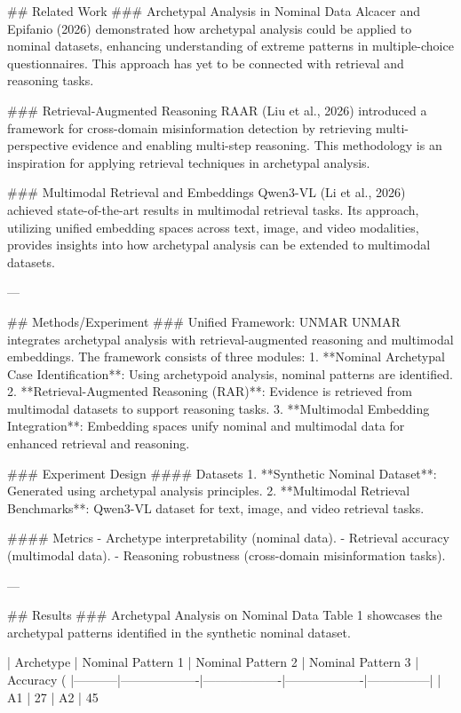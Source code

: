 ## Related Work
### Archetypal Analysis in Nominal Data
Alcacer and Epifanio (2026) demonstrated how archetypal analysis could be applied to nominal datasets, enhancing understanding of extreme patterns in multiple-choice questionnaires. This approach has yet to be connected with retrieval and reasoning tasks.

### Retrieval-Augmented Reasoning
RAAR (Liu et al., 2026) introduced a framework for cross-domain misinformation detection by retrieving multi-perspective evidence and enabling multi-step reasoning. This methodology is an inspiration for applying retrieval techniques in archetypal analysis.

### Multimodal Retrieval and Embeddings
Qwen3-VL (Li et al., 2026) achieved state-of-the-art results in multimodal retrieval tasks. Its approach, utilizing unified embedding spaces across text, image, and video modalities, provides insights into how archetypal analysis can be extended to multimodal datasets.

---

## Methods/Experiment
### Unified Framework: UNMAR
UNMAR integrates archetypal analysis with retrieval-augmented reasoning and multimodal embeddings. The framework consists of three modules:
1. **Nominal Archetypal Case Identification**: Using archetypoid analysis, nominal patterns are identified.
2. **Retrieval-Augmented Reasoning (RAR)**: Evidence is retrieved from multimodal datasets to support reasoning tasks.
3. **Multimodal Embedding Integration**: Embedding spaces unify nominal and multimodal data for enhanced retrieval and reasoning.

### Experiment Design
#### Datasets
1. **Synthetic Nominal Dataset**: Generated using archetypal analysis principles.
2. **Multimodal Retrieval Benchmarks**: Qwen3-VL dataset for text, image, and video retrieval tasks.

#### Metrics
- Archetype interpretability (nominal data).
- Retrieval accuracy (multimodal data).
- Reasoning robustness (cross-domain misinformation tasks).

---

## Results
### Archetypal Analysis on Nominal Data
Table 1 showcases the archetypal patterns identified in the synthetic nominal dataset.

| Archetype | Nominal Pattern 1 | Nominal Pattern 2 | Nominal Pattern 3 | Accuracy (%
|-----------|-------------------|-------------------|-------------------|---------------|
| A1        | 27%
| A2        | 45%

